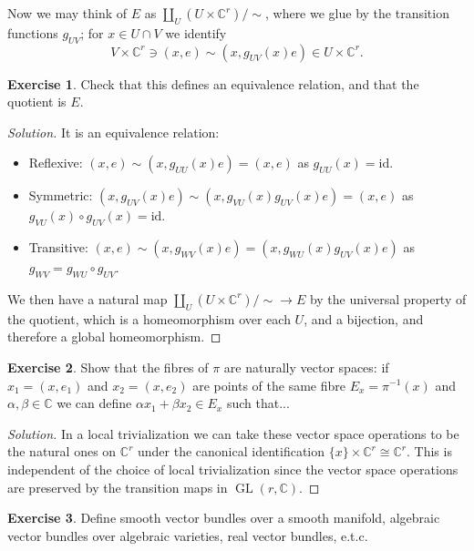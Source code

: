 \documentclass{article}
\theoremstyle{definition}
\newtheorem*{exercise}{Exercise}
\DeclareMathOperator{\GL}{GL}
\newcommand{\id}{\mathrm{id}}
\newcommand{\C}{\mathbb{C}}
\begin{document}
Now we may think of $E$ as $\coprod_U(U\times\C^r)/\sim$, where we glue by the
transition functions $g_{UV}$; for $x\in U\cap V$ we identify
\begin{equation*}
    V\times\C^r\ni(x,e) \sim (x,g_{UV}(x)e)\in U\times\C^r.
\end{equation*}

\begin{exercise}
    Check that this defines an equivalence relation, and that the quotient is
    $E$.
\end{exercise}

\begin{proof}[Solution]
    It is an equivalence relation:
    \begin{itemize}
        \item Reflexive: $(x,e)\sim(x,g_{UU}(x)e)=(x,e)$ as
            $g_{UU}(x)=\id$.
        \item Symmetric: $(x,g_{UV}(x)e)\sim(x,g_{VU}(x)g_{UV}(x)e)=(x,e)$ as
            $g_{VU}(x)\circ g_{UV}(x)=\id$.
        \item Transitive: $(x,e)\sim(x,g_{WV}(x)e)=(x,g_{WU}(x)g_{UV}(x)e)$ as
            $g_{WV}=g_{WU}\circ g_{UV}$.
    \end{itemize}
    We then have a natural map $\coprod_U(U\times\C^r)/\sim\to E$ by the
    universal property of the quotient, which is a homeomorphism over each $U$,
    and a bijection, and therefore a global homeomorphism.
\end{proof}

\begin{exercise}
    Show that the fibres of $\pi$ are naturally vector spaces: if $x_1=(x,e_1)$
    and $x_2=(x,e_2)$ are points of the same fibre $E_x=\pi^{-1}(x)$ and
    $\alpha,\beta\in\C$ we can define $\alpha x_1+\beta x_2\in E_x$ such that...
\end{exercise}

\begin{proof}[Solution]
    In a local trivialization we can take these vector space operations to be
    the natural ones on $\C^r$ under the canonical identification
    $\{x\}\times\C^r\cong\C^r$. This is independent of the choice of local
    trivialization since the vector space operations are preserved by the
    transition maps in $\GL(r,\C)$.
\end{proof}

\begin{exercise}
    Define smooth vector bundles over a smooth manifold, algebraic vector
    bundles over algebraic varieties, real vector bundles, e.t.c.
\end{exercise}
\end{document}
